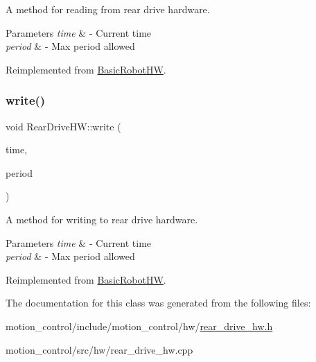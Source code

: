 A method for reading from rear drive hardware. 


\begin{DoxyParams}{Parameters}
{\em time} & -\/ Current time \\
\hline
{\em period} & -\/ Max period allowed \\
\hline
\end{DoxyParams}


Reimplemented from \hyperlink{classBasicRobotHW_a4246adb060fa49a3eb9d5d26845b6425}{Basic\+Robot\+HW}.

\mbox{\label{classRearDriveHW_a36461317b3f595464ef080259bc21fae}} 
\subsubsection{\texorpdfstring{write()}{write()}}
{\footnotesize\ttfamily void Rear\+Drive\+H\+W\+::write (\begin{DoxyParamCaption}\item[{const ros\+::\+Time \&}]{time,  }\item[{const ros\+::\+Duration \&}]{period }\end{DoxyParamCaption})\hspace{0.3cm}{\ttfamily [virtual]}}



A method for writing to rear drive hardware. 


\begin{DoxyParams}{Parameters}
{\em time} & -\/ Current time \\
\hline
{\em period} & -\/ Max period allowed \\
\hline
\end{DoxyParams}


Reimplemented from \hyperlink{classBasicRobotHW_a62add5eabfca2f88a5035db8b8240bb3}{Basic\+Robot\+HW}.



The documentation for this class was generated from the following files\+:\begin{DoxyCompactItemize}
\item 
motion\+\_\+control/include/motion\+\_\+control/hw/\hyperlink{rear__drive__hw_8h}{rear\+\_\+drive\+\_\+hw.\+h}\item 
motion\+\_\+control/src/hw/rear\+\_\+drive\+\_\+hw.\+cpp\end{DoxyCompactItemize}
